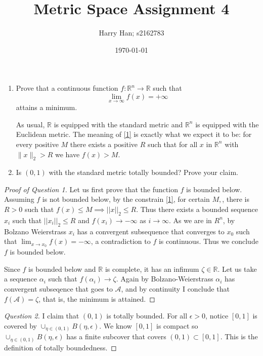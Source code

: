 \documentclass[12pt, a4paper]{article}
\title{Metric Space Assignment 4}
\author{Harry Han; s2162783}
\date{\today}
\theoremstyle{definition}
\theoremstyle{remark}
\newcommand{\bb}[1]{\mathbb{#1}}
\begin{document}
\maketitle

\begin{enumerate}
\item Prove that a continuous function $f:\mathbb{R}^{n} \to \mathbb{R}$ such that
\begin{equation}\label{1}
\lim\limits_{x \to \infty} f(x) = +\infty
\end{equation}
 attains a minimum.

As usual, $\mathbb{R}$ is equipped with the standard metric and $\mathbb{R}^{n}$ is equipped with the Euclidean metric.
The meaning of \eqref{1} is exactly what we expect it to be: for every positive $M$ there exists a positive $R$ such that for all 
$x$ in $\mathbb{R}^n$ with $\|x\|_2>R$ we have $f(x)>M$.


\item Is $(0,1)$ with the standard metric totally bounded? Prove your claim.
\end{enumerate}


\begin{proof}[Proof of Question 1]
  Let us first prove that the function $f$ is bounded below.
  Assuming $f$ is not bounded below, by the constrain \ref{1}, for certain $M, $, there is $R > 0$ such that $f(x)\leq M \implies ||x||_2 \leq R$. 
  Thus there exists a bounded sequence $x_i$ such that $||x_i||_2 \leq R $ and $f(x_i) \rightarrow  -\infty $ as $i \rightarrow  \infty$. 
  As we are in $R^{n}$, by Bolzano Weierstrass $x_i$ has a convergent subsequence that converges to $x_0$ such that $\lim_{x \rightarrow x_0} f(x)= - \infty$, a contradiction to $f$ is continuous. Thus we conclude $f$ is bounded below.

  Since $f$ is bounded below and $ \bb{R} $ is complete, it has an infimum $\zeta \in \bb{R}$. Let us take a sequence $\alpha_i$ such that $f(\alpha_i) \rightarrow \zeta$. Again by Bolzano-Weierstrass $\alpha_i$ has convergent subseqence that goes to $\mathcal{A}$, and by continuity I conclude that $f(\mathcal{A}) = \zeta$, that is, the minimum is attained.
\end{proof}

\begin{proof}[Question 2]
  I claim that $(0,1)$ is totally bounded. 
  For all $\epsilon >0$, notice $[0,1]$ is covered by $\cup_{\eta \in (0,1)} B(\eta, \epsilon)$. We know $[0,1]$ is compact so $\cup_{\eta \in (0,1)} B(\eta, \epsilon)$ has a finite subcover that covers $(0,1) \subset [0,1]$. This is the definition of totally boundedness.
\end{proof}
\end{document}

